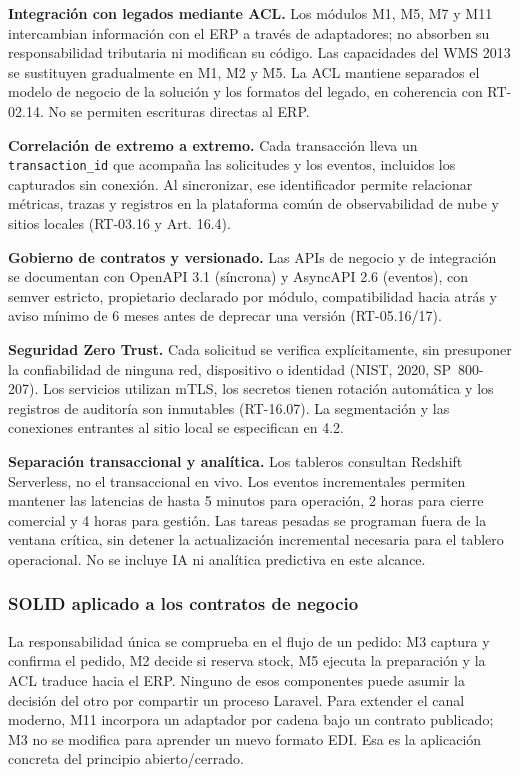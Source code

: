 \textbf{Integración con legados mediante ACL.} Los módulos M1, M5, M7 y M11 intercambian información con el ERP a través de adaptadores; no absorben su responsabilidad tributaria ni modifican su código. Las capacidades del WMS 2013 se sustituyen gradualmente en M1, M2 y M5. La ACL mantiene separados el modelo de negocio de la solución y los formatos del legado, en coherencia con RT-02.14. No se permiten escrituras directas al ERP.

\textbf{Correlación de extremo a extremo.} Cada transacción lleva un \texttt{transaction\_id} que acompaña las solicitudes y los eventos, incluidos los capturados sin conexión. Al sincronizar, ese identificador permite relacionar métricas, trazas y registros en la plataforma común de observabilidad de nube y sitios locales (RT-03.16 y Art. 16.4).

\textbf{Gobierno de contratos y versionado.} Las APIs de negocio y de integración se documentan con OpenAPI 3.1 (síncrona) y AsyncAPI 2.6 (eventos), con semver estricto, propietario declarado por módulo, compatibilidad hacia atrás y aviso mínimo de 6 meses antes de deprecar una versión (RT-05.16/17).

\textbf{Seguridad Zero Trust.} Cada solicitud se verifica explícitamente, sin presuponer la confiabilidad de ninguna red, dispositivo o identidad (NIST, 2020, SP~800-207). Los servicios utilizan mTLS, los secretos tienen rotación automática y los registros de auditoría son inmutables (RT-16.07). La segmentación y las conexiones entrantes al sitio local se especifican en 4.2.

\textbf{Separación transaccional y analítica.} Los tableros consultan Redshift Serverless, no el transaccional en vivo. Los eventos incrementales permiten mantener las latencias de hasta 5 minutos para operación, 2 horas para cierre comercial y 4 horas para gestión. Las tareas pesadas se programan fuera de la ventana crítica, sin detener la actualización incremental necesaria para el tablero operacional. No se incluye IA ni analítica predictiva en este alcance.

\subsubsection{SOLID aplicado a los contratos de negocio}

La responsabilidad única se comprueba en el flujo de un pedido: M3 captura y confirma el pedido, M2 decide si reserva stock, M5 ejecuta la preparación y la ACL traduce hacia el ERP. Ninguno de esos componentes puede asumir la decisión del otro por compartir un proceso Laravel. Para extender el canal moderno, M11 incorpora un adaptador por cadena bajo un contrato publicado; M3 no se modifica para aprender un nuevo formato EDI. Esa es la aplicación concreta del principio abierto/cerrado.

